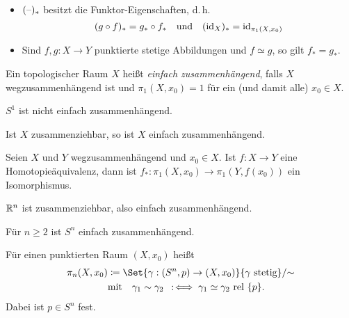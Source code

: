 \documentclass{cheat-sheet}
\newcommand{\rel}{\text{ rel }} %
\begin{document}
\begin{prop}
  \begin{itemize}
    \item $(\text{--})_*$ besitzt die Funktor-Eigenschaften, d.\,h.
    \[
      (g \circ f)_* = g_* \circ f_*
      \quad \text{und} \quad
      (\mathrm{id}_X)_* = \mathrm{id}_{\pi_1(X, x_0)}
    \]
    \item Sind $f, g : X \to Y$ punktierte stetige Abbildungen und $f \simeq g$, so gilt $f_* = g_*$.
  \end{itemize}
\end{prop}

\begin{defn}
  Ein topologischer Raum $X$ heißt \emph{einfach zusammenhängend}, falls $X$ wegzusammenhängend ist und $\pi_1(X, x_0) = 1$ für ein (und damit alle) $x_0 \in X$.
\end{defn}

\begin{bsp}
  $S^1$ ist nicht einfach zusammenhängend.
\end{bsp}

\begin{prop}
  Ist $X$ zusammenziehbar, so ist $X$ einfach zusammenhängend.
\end{prop}


\begin{prop}
  Seien $X$ und $Y$ wegzusammenhängend und $x_0 \in X$. Ist $f : X \to Y$ eine Homotopieäquivalenz, dann ist $f_* : \pi_1(X, x_0) \to \pi_1(Y, f(x_0))$ ein Isomorphismus.
\end{prop}

\begin{bsp}
  $\mathbb{R}^n$ ist zusammenziehbar, also einfach zusammenhängend.
\end{bsp}

\begin{prop}
  Für $n \geq 2$ ist $S^n$ einfach zusammenhängend.
\end{prop}

\begin{defn}
  Für einen punktierten Raum $(X, x_0)$ heißt
  \begin{align*}
    \pi_n(X, x_0) &\coloneqq \Set{ \gamma : (S^n, p) \to (X, x_0) }{ \gamma \text{ stetig}} / {\sim}\\
    & \text{mit} \quad \gamma_1 \sim \gamma_2 \coloniff \gamma_1 \simeq \gamma_2 \rel \{p\}.
  \end{align*}
  Dabei ist $p \in S^n$ fest.
\end{defn}
\end{document}
